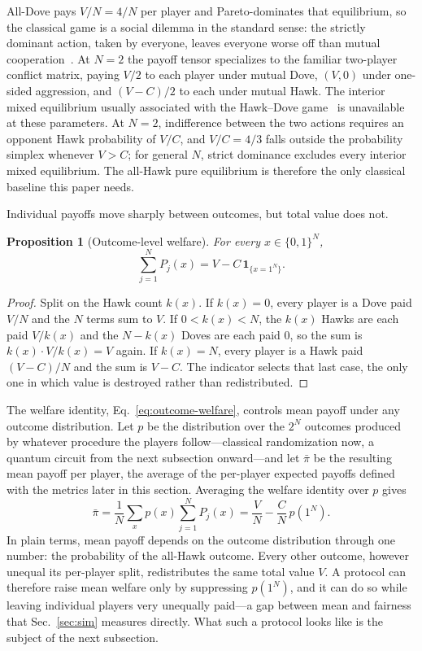 \documentclass[conference,letterpaper,10pt]{IEEEtran}
\newtheorem{proposition}{Proposition}
\begin{document}
All-Dove pays $V/N=4/N$ per player and Pareto-dominates that equilibrium, so the
classical game is a social dilemma in the standard sense: the strictly dominant
action, taken by everyone, leaves everyone worse off than mutual
cooperation~\cite{dawes1980}. At $N=2$ the payoff tensor specializes to the
familiar two-player conflict matrix, paying $V/2$ to each player under mutual
Dove, $(V,0)$ under one-sided aggression, and $(V-C)/2$ to each under mutual
Hawk. The interior mixed equilibrium usually associated with the Hawk--Dove
game~\cite{maynardsmith1973} is unavailable at these parameters. At $N=2$,
indifference between the two actions requires an opponent Hawk probability of
$V/C$, and $V/C=4/3$ falls outside the probability simplex whenever $V>C$; for
general $N$, strict dominance excludes every interior mixed equilibrium. The all-Hawk pure
equilibrium is therefore the only classical baseline this paper needs.

Individual payoffs move sharply between outcomes, but total value does not.

\begin{proposition}[Outcome-level welfare]
For every $x\in\{0,1\}^N$,
\begin{equation}
\sum_{j=1}^{N}P_j(x)=V-C\,\mathbf{1}_{\{x=1^N\}}.
\label{eq:outcome-welfare}
\end{equation}
\end{proposition}

\begin{proof}
Split on the Hawk count $k(x)$. If $k(x)=0$, every player is a Dove paid $V/N$
and the $N$ terms sum to $V$. If $0<k(x)<N$, the $k(x)$ Hawks are each paid
$V/k(x)$ and the $N-k(x)$ Doves are each paid $0$, so the sum is $k(x)\cdot
V/k(x)=V$ again. If $k(x)=N$, every player is a Hawk paid $(V-C)/N$ and the sum
is $V-C$. The indicator selects that last case, the only one in which value is
destroyed rather than redistributed.
\end{proof}

The welfare identity, Eq.~\eqref{eq:outcome-welfare}, controls mean payoff under
any outcome distribution. Let $p$ be the distribution over the $2^N$ outcomes
produced by whatever procedure the players follow---classical randomization now,
a quantum circuit from the next subsection onward---and let $\bar\pi$ be the
resulting mean payoff per player, the average of the per-player expected payoffs
defined with the metrics later in this section. Averaging the welfare identity
over $p$ gives
\begin{equation}
\bar\pi=\frac{1}{N}\sum_{x}p(x)\sum_{j=1}^{N}P_j(x)
=\frac{V}{N}-\frac{C}{N}\,p(1^N).
\label{eq:mean-welfare}
\end{equation}
In plain terms, mean payoff depends on the outcome distribution through one
number: the probability of the all-Hawk outcome. Every other outcome, however
unequal its per-player split, redistributes the same total value $V$. A protocol
can therefore raise mean welfare only by suppressing $p(1^N)$, and it can do so
while leaving individual players very unequally paid---a gap between mean and
fairness that Sec.~\ref{sec:sim} measures directly. What such a protocol looks
like is the subject of the next subsection.
\end{document}

